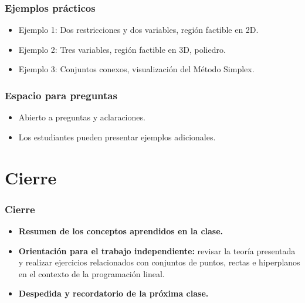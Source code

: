 \documentclass{beamer}
\begin{document}
\begin{frame}
    \frametitle{Ejemplos prácticos}
    \begin{itemize}
        \item Ejemplo 1: Dos restricciones y dos variables, región factible en 2D.
        \item Ejemplo 2: Tres variables, región factible en 3D, poliedro.
        \item Ejemplo 3: Conjuntos conexos, visualización del Método Simplex.
    \end{itemize}
\end{frame}

\begin{frame}
    \frametitle{Espacio para preguntas}
    \begin{itemize}
        \item Abierto a preguntas y aclaraciones.
        \item Los estudiantes pueden presentar ejemplos adicionales.
    \end{itemize}
\end{frame}

\section{Cierre}
\begin{frame}
    \frametitle{Cierre}
    \begin{itemize}
        \item \textbf{Resumen de los conceptos aprendidos en la clase.}
        \item \textbf{Orientación para el trabajo independiente:} revisar la teoría presentada y realizar ejercicios relacionados con conjuntos de puntos, rectas e hiperplanos en el contexto de la programación lineal.
        \item \textbf{Despedida y recordatorio de la próxima clase.}
    \end{itemize}
\end{frame}
\end{document}
